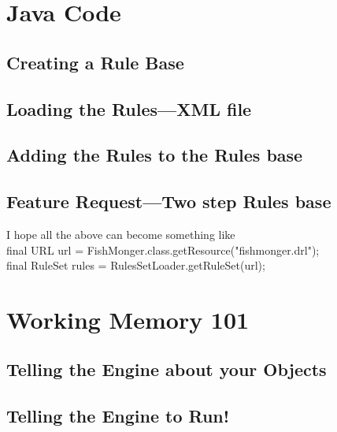 \section{Java Code}
\subsection{Creating a Rule Base}

\subsection{Loading the Rules---XML file}

\subsection{Adding the Rules to the Rules base}

\subsection{Feature Request---Two step Rules base}
I hope all the above can become something like\\
final URL url = FishMonger.class.getResource("fishmonger.drl");\\
final RuleSet rules = RulesSetLoader.getRuleSet(url);


\clearpage
\section{Working Memory 101}

\subsection{Telling the Engine about your Objects}

\subsection{Telling the Engine to Run!}




